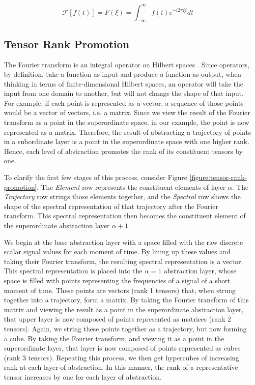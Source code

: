 \begin{equation}
  \label{equation:fourier-transform}
  \mathcal{F} [f(t)] = F(\xi) = \int_{-\infty}^\infty f(t) e^{-i 2 \pi \xi t} dt
\end{equation}

\subsection{Tensor Rank Promotion}
\label{section:tensor-rank-promotion}

The Fourier transform is an integral operator on Hilbert spaces \citep{kennedy2013hilbert}.  Since operators, by definition, take a function as input and produce a function as output, when thinking in terms of finite-dimensional Hilbert spaces, an operator will take the input from one domain to another, but will not change the shape of that input.  For example, if each point is represented as a vector, a sequence of those points would be a vector of vectors, i.e. a matrix.  Since we view the result of the Fourier transform as a point in the superordinate space, in our example, the point is now represented as a matrix.  Therefore, the result of abstracting a trajectory of points in a subordinate layer is a point in the superordinate space with one higher rank.  Hence, each level of abstraction promotes the rank of its constituent tensors by one. 

To clarify the first few stages of this process, consider Figure \ref{figure:tensor-rank-promotion}. The \textit{Element} row represents the constituent elements of layer $\alpha$.  The \textit{Trajectory} row strings those elements together, and the \textit{Spectral} row shows the shape of the spectral representation of that trajectory after the Fourier transform.  This spectral representation then becomes the constituent element of the superordinate abstraction layer $\alpha+1$.

We begin at the base abstraction layer with a space filled with the raw discrete scalar signal values for each moment of time.  By lining up these values and taking their Fourier transform, the resulting spectral representation is a vector.  This spectral representation is placed into the $\alpha=1$ abstraction layer, whose space is filled with points representing the frequencies of a signal of a short moment of time.  These points are vectors (rank 1 tensors) that, when strung together into a trajectory, form a matrix.  By taking the Fourier transform of this matrix and viewing the result as a point in the superordinate abstraction layer, that upper layer is now composed of points represented as matrices (rank 2 tensors).  Again, we string these points together as a trajectory, but now forming a cube.  By taking the Fourier transform, and viewing it as a point in the superordinate layer, that layer is now composed of points represented as cubes (rank 3 tensors). Repeating this process, we then get hypercubes of increasing rank at each layer of abstraction.  In this manner, the rank of a representative tensor increases by one for each layer of abstraction.

